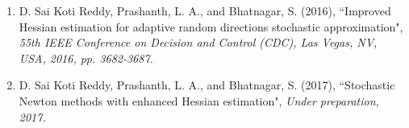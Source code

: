 \begin{enumerate}
\item D. Sai Koti Reddy, Prashanth, L. A., and  Bhatnagar, S. (2016), ``Improved Hessian estimation for adaptive random directions stochastic approximation", {\em 55th IEEE  Conference on Decision and Control (CDC), Las Vegas, NV, USA, 2016, pp. 3682-3687.} \\
\item D. Sai Koti Reddy, Prashanth, L. A., and  Bhatnagar, S. (2017), ``Stochastic Newton methods with enhanced Hessian estimation", {\em Under preparation, 2017.} \\ \\

\end{enumerate}
